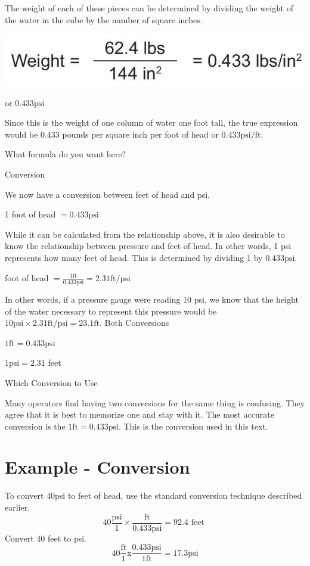 \documentclass[10pt]{article}
\begin{document}
The weight of each of these pieces can be determined by dividing the weight of the water in the cube by the number of square inches.

\includegraphics[max width=\textwidth]{2022_09_11_72dbedc910e6e984560cg-42(1)}

or $0.433 \mathrm{psi}$

Since this is the weight of one column of water one foot tall, the true expression would be $0.433$ pounds per square inch per foot of head or $0.433 \mathrm{psi} / \mathrm{ft}$.

What formula do you want here?

Conversion

We now have a conversion between feet of head and psi.

1 foot of head $=0.433 \mathrm{psi}$

While it can be calculated from the relationship above, it is also desirable to know the relationship between pressure and feet of head. In other words, 1 psi represents how many feet of head. This is determined by dividing 1 by $0.433 \mathrm{psi}$.

foot of head $=\frac{1 \mathrm{ft}}{0.433 \mathrm{psi}}=2.31 \mathrm{ft} / \mathrm{psi}$

In other words, if a pressure gauge were reading 10 psi, we know that the height of the water necessary to represent this pressure would be $10 \mathrm{psi} \times 2.31 \mathrm{ft} / \mathrm{psi}=23.1 \mathrm{ft}$. Both Conversions

$1 \mathrm{ft}=0.433 \mathrm{psi}$

$1 \mathrm{psi}=2.31$ feet

Which Conversion to Use

Many operators find having two conversions for the same thing is confusing. They agree that it is best to memorize one and stay with it. The most accurate conversion is the $1 \mathrm{ft}=0.433 \mathrm{psi}$. This is the conversion used in this text.

\section{Example - Conversion}
To convert $40 \mathrm{psi}$ to feet of head, use the standard conversion technique described earlier.
$$
40 \frac{\mathrm{psi}}{1} \times \frac{\mathrm{ft}}{0.433 \mathrm{psi}}=92.4 \text { feet }
$$
Convert 40 feet to psi.
$$
40 \frac{\mathrm{ft}}{1} \mathrm{x} \frac{0.433 \mathrm{psi}}{1 \mathrm{ft}}=17.3 \mathrm{psi}
$$
\end{document}
